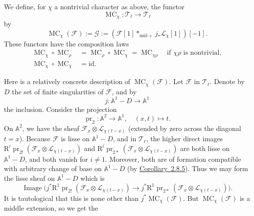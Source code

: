 We define, for \(\chi\) a nontrivial character as above, the functor
\[
  \operatorname{MC}_\chi:\mathcal{T}_\ell\to\mathcal{T}_\ell
\]
by
\[
  \operatorname{MC}_\chi(\mathcal{F}):=\mathcal{G}:=
  (\mathcal{F}[1]*_{\mathrm{mid}+}j_*\mathcal{L}_\chi[1])[-1].
\]
These functors have the composition laws
\[
\begin{aligned}
  \operatorname{MC}_\chi\circ\operatorname{MC}_\rho
  &=\operatorname{MC}_\rho\circ\operatorname{MC}_\chi
  =\operatorname{MC}_{\chi\rho}\quad\text{if \(\chi\rho\) is nontrivial},\\
  \operatorname{MC}_\chi\circ\operatorname{MC}_{\bar{\chi}}&=\mathrm{id}.
\end{aligned}
\]

Here is a relatively concrete description of \(\operatorname{MC}_\chi(\mathcal{F})\).
Let \(\mathcal{F}\) in \(\mathcal{T}_\ell\). Denote by \(D\) the set of finite
singularities of \(\mathcal{F}\), and by
\[
  j:\mathbb{A}^1-D\to\mathbb{A}^1
\]
the inclusion. Consider the projection
\[
  \operatorname{pr}_2:\mathbb{A}^2\to\mathbb{A}^1,\quad (x,t)\mapsto t.
\]
On \(\mathbb{A}^2\), we have the sheaf
\(\mathcal{F}_x\otimes\mathcal{L}_{\chi(t-x)}\) (extended by zero across the
diagonal \(t=x\)). Because \(\mathcal{F}\) is lisse on \(\mathbb{A}^1-D\), and
in \(\mathcal{T}_\ell\), the higher direct images
\(\mathrm{R}^i\operatorname{pr}_{2!}(\mathcal{F}_x\otimes\mathcal{L}_{\chi(t-x)})\)
and
\(\mathrm{R}^i\operatorname{pr}_{2*}(\mathcal{F}_x\otimes\mathcal{L}_{\chi(t-x)})\)
are both lisse on \(\mathbb{A}^1-D\), and both vanish for \(i\neq 1\).
Moreover, both are of formation compatible with arbitrary change of base on
\(\mathbb{A}^1-D\) (by \hyperref[cor:2.8.5]{Corollary~2.8.5}). Thus we may
form the lisse sheaf on \(\mathbb{A}^1-D\) which is
\[
  \operatorname{Image}\bigl(
  j^*\mathrm{R}^1\operatorname{pr}_{2!}(\mathcal{F}_x\otimes\mathcal{L}_{\chi(t-x)})
  \to
  j^*\mathrm{R}^1\operatorname{pr}_{2*}(\mathcal{F}_x\otimes\mathcal{L}_{\chi(t-x)})
  \bigr).
\]
It is tautological that this is none other than
\(j^*\operatorname{MC}_\chi(\mathcal{F})\). But
\(\operatorname{MC}_\chi(\mathcal{F})\) is a middle extension, so we get the

